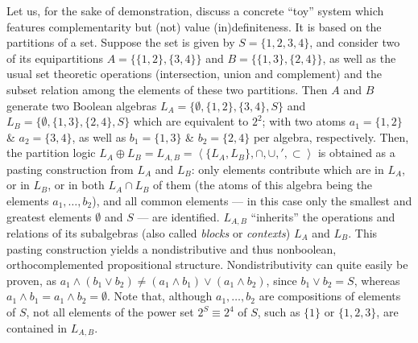 \documentclass[12pt]{elsarticle}%
\begin{document}
Let us, for the sake of demonstration,
discuss a concrete ``toy'' system which features complementarity but (not) value (in)definiteness.
It is based on the partitions of a set.
Suppose the set is given by
$S=\{1,2,3,4\}$,
and consider two of its equipartitions
$A=\{\{1,2\},\{3,4\}\}$
and
$B=\{\{1,3\},\{2,4\}\}$, as well as
the usual set theoretic operations (intersection, union and complement) and
the subset relation among the elements of these two partitions.
Then $A$ and $B$ generate two Boolean algebras
$L_A= \{\emptyset ,\{1,2\},\{3,4\},S\}$
and
$L_B= \{\emptyset ,\{1,3\},\{2,4\},S\}$
which are equivalent to $2^2$; with two atoms
$a_1=\{1,2\}$ \& $a_2=\{3,4\}$, as well as
$b_1=\{1,3\}$  \& $b_2=\{2,4\}$
per algebra, respectively.
Then, the partition logic
$L_A \oplus L_B = L_{A,B} = \left\langle \{L_A,L_B\},\cap, \cup, ',\subset \right\rangle $
is obtained as a pasting construction from $L_A$ and $L_B$:
only elements contribute which are in $L_A$, or in $L_B$, or in both $L_A \cap L_B$ of them
(the atoms of this algebra being the elements  $a_1,\ldots ,b_2$),
and all common elements --- in this case only the smallest and greatest elements $\emptyset$
and $S$  ---  are identified.
$L_{A,B}$ ``inherits'' the operations and relations of its subalgebras (also called {\em blocks}
or {\em contexts}) $L_A$ and $L_B$.
This pasting construction yields a nondistributive and thus
nonboolean, orthocomplemented propositional structure.
Nondistributivity can quite easily be proven,
as  $a_1 \wedge (b_1 \vee b_2) \neq  (a_1 \wedge b_1) \vee (a_1 \wedge b_2)$,
since $b_1 \vee b_2=S$, whereas  $a_1 \wedge b_1= a_1 \wedge b_2 =\emptyset$.
Note that, although $a_1,\ldots ,b_2$ are compositions of elements of $S$,
not all elements of the power set $2^S\equiv 2^4$ of $S$,  such
as $\{1\}$ or $\{1,2,3\}$, are contained in $L_{A,B}$.
\end{document}
